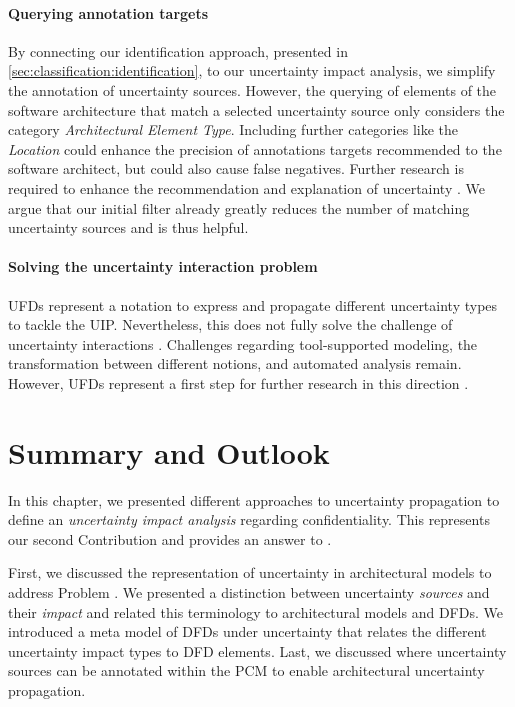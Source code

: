\paragraph{Querying annotation targets}
By connecting our identification approach, presented in \autoref{sec:classification:identification}, to our uncertainty impact analysis, we simplify the annotation of uncertainty sources.
However, the querying of elements of the software architecture that match a selected uncertainty source only considers the category \emph{Architectural Element Type}.
Including further categories like the \emph{Location} could enhance the precision of annotations targets recommended to the software architect, but could also cause false negatives.
Further research is required to enhance the recommendation and explanation of uncertainty \cite{bersani_conceptual_2023}.
We argue that our initial filter already greatly reduces the number of matching uncertainty sources and is thus helpful.

\paragraph{Solving the uncertainty interaction problem}
\acp{UFD} represent a notation to express and propagate different uncertainty types to tackle the \ac{UIP}.
Nevertheless, this does not fully solve the challenge of uncertainty interactions \cite{camara_addressing_2022}.
Challenges regarding tool-supported modeling, the transformation between different notions, and automated analysis remain.
However, \acp{UFD} represent a first step for further research in this direction \cite{camara_uncertainty_2024,weyns_towards_2023}.





\section{Summary and Outlook}%
\label{sec:impactanalysis:summary}

In this chapter, we presented different approaches to uncertainty propagation to define an \emph{uncertainty impact analysis} regarding confidentiality.
This represents our second Contribution  and provides an answer to .

First, we discussed the representation of uncertainty in architectural models to address Problem .
We presented a distinction between uncertainty \emph{sources} and their \emph{impact} and related this terminology to architectural models and \acp{DFD}.
We introduced a meta model of \acp{DFD} under uncertainty that relates the different uncertainty impact types to \ac{DFD} elements.
Last, we discussed where uncertainty sources can be annotated within the \ac{PCM} to enable architectural uncertainty propagation.

